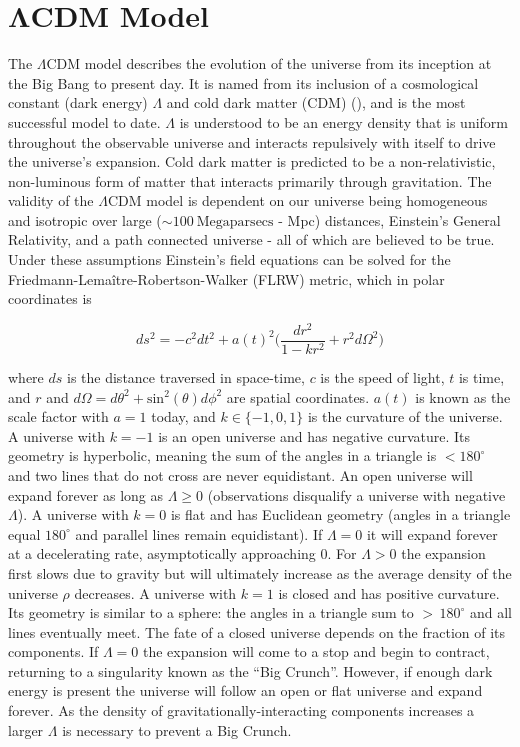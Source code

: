 \section[$\Lambda$CDM Model][$\Lambda$CDM Model]{$\boldsymbol{\Lambda}$CDM Model}
\label{sec:dark_matter_lambda_cdm}
The $\Lambda \mathrm{CDM}$ model describes the evolution of the universe from its inception at the Big Bang to present day.  It is named
from its inclusion of a cosmological constant (dark energy) $\Lambda$ and cold dark matter (CDM) (), and is the
most successful model to
date.  $\Lambda$ is understood to be an energy density that is uniform throughout the observable universe and interacts repulsively with
itself to drive the universe's expansion.  Cold dark matter is predicted to be a non-relativistic, non-luminous form of matter that
interacts primarily through gravitation.  The validity of the $\Lambda \mathrm{CDM}$ model is dependent on our universe being homogeneous
and isotropic over large
(${\sim} 100\ \mathrm{Megaparsecs}$ - Mpc) distances,
Einstein's General Relativity, and a path connected universe - all of which are believed to be true.  Under these assumptions Einstein's
field equations can be solved for the Friedmann-Lema\^{i}tre-Robertson-Walker (FLRW) metric, which in polar coordinates is

\begin{equation}
ds^{2} = -c^{2}dt^{2} + a(t)^{2} \bigg( \frac{dr^{2}}{1 - kr^{2}} + r^{2}d\Omega^{2} \bigg)
\label{eq:dark_matter_lambda_cdm_rw_metric}
\end{equation}

\noindent where $ds$ is the distance traversed in space-time, $c$ is the speed of light, $t$ is time, and $r$ and
$d\Omega = d\theta^2 + \mathrm{sin}^2(\theta)d\phi^2$ are spatial coordinates.  $a(t)$ is known as the scale factor with $a=1$ today, and
$k \in \{-1, 0, 1\}$ is the curvature of the
universe.  A universe with $k = -1$ is an open universe and has negative curvature.  Its geometry is hyperbolic, meaning the
sum of the angles in a triangle is $< 180^{\circ}$ and two lines that do not cross are never equidistant.  An open universe will expand
forever as long as $\Lambda \geq 0$ (observations disqualify a universe with negative $\Lambda$).  A universe with $k = 0$ is flat and
has Euclidean geometry (angles in a triangle equal $180^{\circ}$ and parallel lines remain equidistant).  If $\Lambda = 0$ it will
expand forever at a decelerating rate, asymptotically approaching 0.  For $\Lambda > 0$ the expansion first slows due to gravity but will
ultimately increase as the average density of the universe $\rho$ decreases.  A universe with $k = 1$ is closed and has positive
curvature.  Its geometry is similar to a sphere: the angles in
a triangle sum to ${>}\, 180^{\circ}$ and all lines eventually meet.  The fate of a closed universe depends on the fraction of its
components.  If $\Lambda = 0$ the expansion will come to a stop and begin to
contract, returning to a singularity known as the ``Big Crunch''.  However, if enough dark energy is present the universe will follow
an open or flat universe and expand forever.  As the density of gravitationally-interacting components increases a larger $\Lambda$ is
necessary to prevent a Big Crunch.

